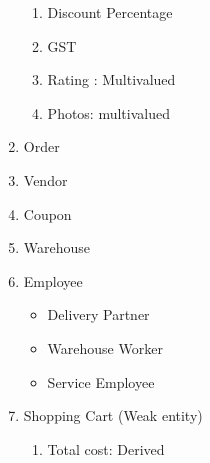 \documentclass[12pt]{report}
\begin{document}
\begin{enumerate}
\begin{enumerate}
                \item Discount Percentage
                \item GST
                \item Rating : Multivalued
                \item Photos: multivalued
            \end{enumerate}
        \item Order
        \item Vendor
        \item Coupon
        \item Warehouse
        \item Employee
            \begin{itemize}
                \item Delivery Partner
                \item Warehouse Worker
                \item Service Employee
            \end{itemize}
        \item Shopping Cart (Weak entity)
            \begin{enumerate}
                \item Total cost: Derived
            \end{enumerate}
    \end{enumerate}
\end{document}
